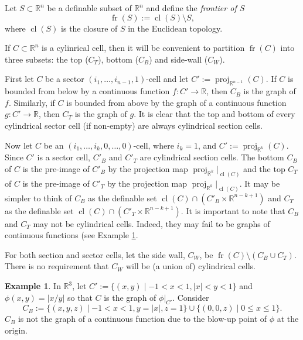 \documentclass[
]{book}
\theoremstyle{definition}
\theoremstyle{definition}
\newtheorem{example}{Example}[chapter]
\theoremstyle{definition}
\theoremstyle{definition}
\theoremstyle{remark}
\begin{document}
Let \(S \subset \mathbb{R}^n\) be a definable subset of \(\mathbb{R}^n\) and define the \emph{frontier of \(S\)}
\[
{\operatorname{fr} \left( S \right)} := {\operatorname{cl} \left( S \right)} \setminus S,
\]
where \({\operatorname{cl} \left( S \right)}\) is the closure of \(S\) in the Euclidean topology.

If \(C \subset \mathbb{R}^n\) is a cylinrical cell, then it will be convenient to partition \({\operatorname{fr} \left( C \right)}\) into three subsets: the top (\(C_T\)), bottom (\(C_B\)) and side-wall (\(C_W\)).

First let \(C\) be a sector \((i_1,\ldots,i_{n-1},1)\)-cell and let \(C' := {\operatorname{proj}_{\mathbb{R}^{n-1}}}(C)\). If \(C\) is bounded from below by a continuous function \(f : C' \to \mathbb{R}\), then \(C_B\) is the graph of \(f\). Similarly, if \(C\) is bounded from above by the graph of a continuous function \(g : C' \to \mathbb{R}\), then \(C_T\) is the graph of \(g\). It is clear that the top and bottom of every cylindrical sector cell (if non-empty) are always cylindrical section cells.

Now let \(C\) be an \((i_1,\ldots,i_{k},0,\ldots,0)\)-cell, where \(i_{k}=1\), and \(C' := {\operatorname{proj}_{\mathbb{R}^{k}}}(C)\). Since \(C'\) is a sector cell, \(C'_B\) and \(C'_T\) are cylindrical section cells. The bottom \(C_B\) of \(C\) is the pre-image of \(C'_B\) by the projection map \({\operatorname{proj}_{\mathbb{R}^{k}}}\vert_{{\operatorname{cl} \left( C \right)}}\) and the top \(C_T\) of \(C\) is the pre-image of \(C'_T\) by the projection map \({\operatorname{proj}_{\mathbb{R}^{k}}}\vert_{{\operatorname{cl} \left( C \right)}}\).
It may be simpler to think of \(C_B\) as the definable set \({\operatorname{cl} \left( C \right)} \cap (C'_B \times \mathbb{R}^{n - k + 1})\) and \(C_T\) as the definable set \({\operatorname{cl} \left( C \right)} \cap (C'_T \times \mathbb{R}^{n - k + 1})\).
It is important to note that \(C_B\) and \(C_T\) may not be cylindrical cells. Indeed, they may fail to be graphs of continuous functions (see Example \ref{exm:top-bottom-not-cylindrical}.

For both section and sector cells, let the side wall, \(C_W\), be \({\operatorname{fr} \left( C \right)} \setminus (C_B \cup C_T)\).
There is no requirement that \(C_W\) will be (a union of) cylindrical cells.

\begin{example}
\protect\hypertarget{exm:top-bottom-not-cylindrical}{}\label{exm:top-bottom-not-cylindrical}In \(\mathbb{R}^3\), let \(C' := \{ (x,y) \mid -1 < x < 1, \vert x \vert < y < 1 \}\) and \(\phi(x,y) = \vert x / y \vert\) so that \(C\) is the graph of \(\phi\vert_{C'}\).
Consider \[
C_B := \{ (x,y,z) \mid -1 < x < 1, y = \vert x \vert, z = 1 \} \cup \{ (0,0,z) \mid 0 \le x \le 1 \}.
\]
\(C_B\) is not the graph of a continuous function due to the blow-up point of \(\phi\) at the origin.
\end{example}
\end{document}
